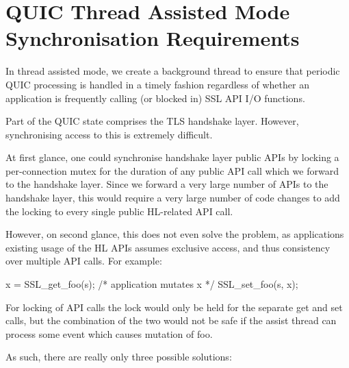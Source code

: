 \chapter{QUIC Thread Assisted Mode Synchronisation Requirements}
\hypertarget{md__c_1_2_users_2namph_2_downloads_2openssl_2openssl-3_82_81_2doc_2designs_2quic-design_2quic-thread-assist}{}\label{md__c_1_2_users_2namph_2_downloads_2openssl_2openssl-3_82_81_2doc_2designs_2quic-design_2quic-thread-assist}
In thread assisted mode, we create a background thread to ensure that periodic QUIC processing is handled in a timely fashion regardless of whether an application is frequently calling (or blocked in) SSL API I/O functions.

Part of the QUIC state comprises the TLS handshake layer. However, synchronising access to this is extremely difficult.

At first glance, one could synchronise handshake layer public APIs by locking a per-\/connection mutex for the duration of any public API call which we forward to the handshake layer. Since we forward a very large number of APIs to the handshake layer, this would require a very large number of code changes to add the locking to every single public HL-\/related API call.

However, on second glance, this does not even solve the problem, as applications existing usage of the HL APIs assumes exclusive access, and thus consistency over multiple API calls. For example\+: \begin{DoxyVerb}x = SSL_get_foo(s);
/* application mutates x */
SSL_set_foo(s, x);
\end{DoxyVerb}
 For locking of API calls the lock would only be held for the separate get and set calls, but the combination of the two would not be safe if the assist thread can process some event which causes mutation of {\ttfamily foo}.

As such, there are really only three possible solutions\+:


